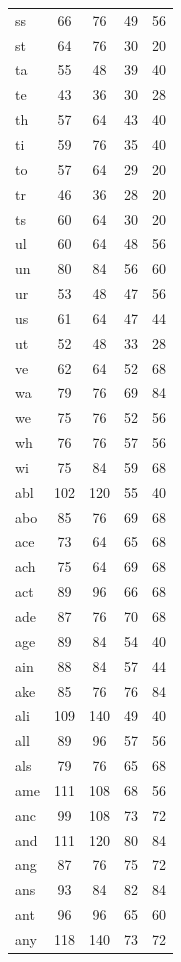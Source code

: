 \documentclass[ms,electronic,twosidetoc,letterpaper,chaptercenter,parttop,lof,lot]{byumsphd}
\begin{document}
\begin{table}
\begin{tabular}{| l | c c | c c |}
  ss & 66 & 76 & 49 & 56 \\
  st & 64 & 76 & 30 & 20 \\
  ta & 55 & 48 & 39 & 40 \\
  te & 43 & 36 & 30 & 28 \\
  th & 57 & 64 & 43 & 40 \\
  ti & 59 & 76 & 35 & 40 \\
  to & 57 & 64 & 29 & 20 \\
  tr & 46 & 36 & 28 & 20 \\
  ts & 60 & 64 & 30 & 20 \\
  ul & 60 & 64 & 48 & 56 \\
  un & 80 & 84 & 56 & 60 \\
  ur & 53 & 48 & 47 & 56 \\
  us & 61 & 64 & 47 & 44 \\
  ut & 52 & 48 & 33 & 28 \\
  ve & 62 & 64 & 52 & 68 \\
  wa & 79 & 76 & 69 & 84 \\
  we & 75 & 76 & 52 & 56 \\
  wh & 76 & 76 & 57 & 56 \\
  wi & 75 & 84 & 59 & 68 \\
  abl & 102 & 120 & 55 & 40 \\
  abo & 85 & 76 & 69 & 68 \\
  ace & 73 & 64 & 65 & 68 \\
  ach & 75 & 64 & 69 & 68 \\
  act & 89 & 96 & 66 & 68 \\
  ade & 87 & 76 & 70 & 68 \\
  age & 89 & 84 & 54 & 40 \\
  ain & 88 & 84 & 57 & 44 \\
  ake & 85 & 76 & 76 & 84 \\
  ali & 109 & 140 & 49 & 40 \\
  all & 89 & 96 & 57 & 56 \\
  als & 79 & 76 & 65 & 68 \\
  ame & 111 & 108 & 68 & 56 \\
  anc & 99 & 108 & 73 & 72 \\
  and & 111 & 120 & 80 & 84 \\
  ang & 87 & 76 & 75 & 72 \\
  ans & 93 & 84 & 82 & 84 \\
  ant & 96 & 96 & 65 & 60 \\
  any & 118 & 140 & 73 & 72 \\

\end{tabular}
\end{table}
\end{document}
